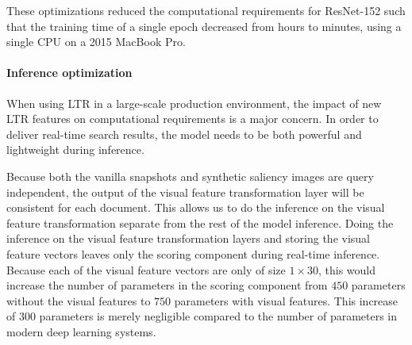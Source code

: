 These optimizations reduced the computational requirements for ResNet-152 such that the training time of a single epoch decreased from hours to minutes, using a single CPU on a 2015 MacBook Pro. 

\paragraph{Inference optimization}
When using \ac{LTR} in a large-scale production environment, the impact of new \ac{LTR} features on computational requirements is a major concern. 
In order to deliver real-time search results, the model needs to be both powerful and lightweight during inference. 

Because both the vanilla snapshots and synthetic saliency images are query independent, the output of the visual feature transformation layer will be consistent for each document. This allows us to do the inference on the visual feature transformation separate from the rest of the model inference. Doing the inference on the visual feature transformation layers and storing the visual feature vectors leaves only the scoring component during real-time inference. Because each of the visual feature vectors are only of size $1\times30$, this would increase the number of parameters in the scoring component from $450$ parameters without the visual features to $750$ parameters with visual features. This increase of $300$ parameters is merely negligible compared to the number of parameters in modern deep learning systems. 




